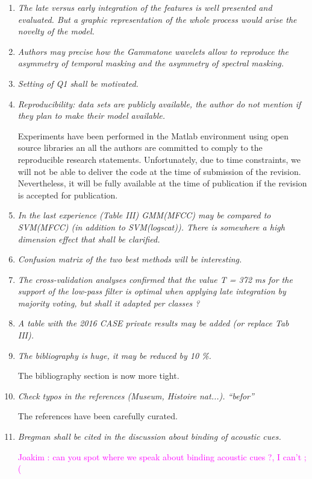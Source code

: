 \documentclass[10pt]{article}
\newcommand{\ja}[1]{\textcolor{magenta}{Joakim : #1}}
\begin{document}
\begin{enumerate}

\item \emph{The late versus early integration of the features is well presented and evaluated. But a graphic representation of the whole process would arise the novelty of the model.}

\item \emph{Authors may precise  how the Gammatone wavelets allow to reproduce the asymmetry of temporal masking and the asymmetry of spectral masking.}

\item \emph{Setting of Q1 shall be motivated.}

\item \emph{Reproducibility:  data sets are publicly available, the author do not mention if they plan to make their model available.}

Experiments have been performed in the Matlab environment using open source libraries an all the authors are committed to comply to the reproducible research statements. Unfortunately, due to time constraints, we will not be able to deliver the code at the time of submission of the revision. Nevertheless, it will be fully available at the time of publication if the revision is accepted for publication.

\item \emph{In the last experience (Table III) GMM(MFCC) may be compared to SVM(MFCC) (in addition to SVM(logscat)). There is somewhere a high dimension effect that shall be clarified.}

\item \emph{Confusion matrix of the two best methods will be interesting.}

\item \emph{The cross-validation analyses confirmed that the value T = 372 ms for the support of the low-pass filter is optimal when applying late integration by majority voting, but shall it adapted per classes  ?}

\item \emph{A table with the 2016 CASE private results may be added (or replace Tab III).}

\item \emph{The bibliography is huge, it may be reduced by 10 \%.}

The bibliography section is now more tight. 

\item \emph{Check typos in the references (Museum, Histoire nat...). “befor”}

The references have been carefully curated.

\item \emph{Bregman shall be cited in the discussion about  binding of acoustic cues.}

\ja{can you spot where we speak about binding acoustic cues ?, I can't ;(}

\end{enumerate}
\end{document}
